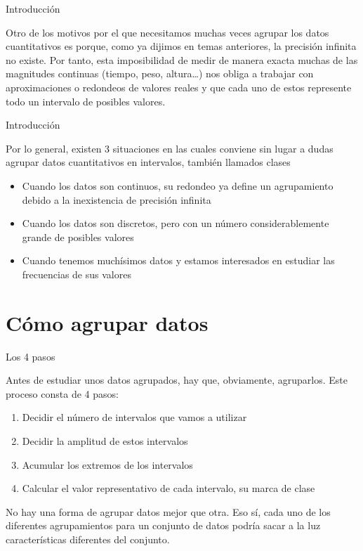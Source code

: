 \documentclass[
  ignorenonframetext,
]{beamer}
\providecommand{\tightlist}{%
  \setlength{\itemsep}{0pt}\setlength{\parskip}{0pt}}
\begin{document}
\begin{frame}{Introducción}
\protect\hypertarget{introducciuxf3n-1}{}

Otro de los motivos por el que necesitamos muchas veces agrupar los
datos cuantitativos es porque, como ya dijimos en temas anteriores, la
precisión infinita no existe. Por tanto, esta imposibilidad de medir de
manera exacta muchas de las magnitudes continuas (tiempo, peso,
altura\ldots) nos obliga a trabajar con aproximaciones o redondeos de
valores reales y que cada uno de estos represente todo un intervalo de
posibles valores.

\end{frame}

\begin{frame}{Introducción}
\protect\hypertarget{introducciuxf3n-2}{}

Por lo general, existen 3 situaciones en las cuales conviene sin lugar a
dudas agrupar datos cuantitativos en intervalos, también llamados clases

\begin{itemize}
\tightlist
\item
  Cuando los datos son continuos, su redondeo ya define un agrupamiento
  debido a la inexistencia de precisión infinita
\item
  Cuando los datos son discretos, pero con un número considerablemente
  grande de posibles valores
\item
  Cuando tenemos muchísimos datos y estamos interesados en estudiar las
  frecuencias de sus valores
\end{itemize}

\end{frame}

\hypertarget{cuxf3mo-agrupar-datos}{%
\section{Cómo agrupar datos}\label{cuxf3mo-agrupar-datos}}

\begin{frame}{Los 4 pasos}
\protect\hypertarget{los-4-pasos}{}

Antes de estudiar unos datos agrupados, hay que, obviamente, agruparlos.
Este proceso consta de 4 pasos:

\begin{enumerate}
\tightlist
\item
  Decidir el número de intervalos que vamos a utilizar
\item
  Decidir la amplitud de estos intervalos
\item
  Acumular los extremos de los intervalos
\item
  Calcular el valor representativo de cada intervalo, su marca de clase
\end{enumerate}

No hay una forma de agrupar datos mejor que otra. Eso sí, cada uno de
los diferentes agrupamientos para un conjunto de datos podría sacar a la
luz características diferentes del conjunto.

\end{frame}
\end{document}

